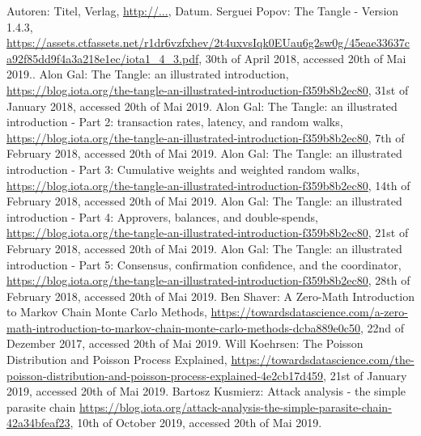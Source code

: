 \begin{thebibliography}{99}

 Autoren: Titel, Verlag, \url{http://...}, Datum.
 Serguei Popov: The Tangle - Version 1.4.3, \url{https://assets.ctfassets.net/r1dr6vzfxhev/2t4uxvsIqk0EUau6g2sw0g/45eae33637ca92f85dd9f4a3a218e1ec/iota1_4_3.pdf}, 30th of April 2018, accessed 20th of Mai 2019..
 Alon Gal: The Tangle: an illustrated introduction, \url{https://blog.iota.org/the-tangle-an-illustrated-introduction-f359b8b2ec80}, 31st of January 2018, accessed 20th of Mai 2019.
 Alon Gal: The Tangle: an illustrated introduction - Part 2: transaction rates, latency, and random walks, \url{https://blog.iota.org/the-tangle-an-illustrated-introduction-f359b8b2ec80}, 7th of February 2018, accessed 20th of Mai 2019.
 Alon Gal: The Tangle: an illustrated introduction - Part 3: Cumulative weights and weighted random walks, \url{https://blog.iota.org/the-tangle-an-illustrated-introduction-f359b8b2ec80}, 14th of February 2018, accessed 20th of Mai 2019.
 Alon Gal: The Tangle: an illustrated introduction - Part 4: Approvers, balances, and double-spends, \url{https://blog.iota.org/the-tangle-an-illustrated-introduction-f359b8b2ec80}, 21st of February 2018, accessed 20th of Mai 2019.
 Alon Gal: The Tangle: an illustrated introduction - Part 5: Consensus, confirmation confidence, and the coordinator, \url{https://blog.iota.org/the-tangle-an-illustrated-introduction-f359b8b2ec80}, 28th of February 2018, accessed 20th of Mai 2019.
 Ben Shaver: A Zero-Math Introduction to Markov Chain Monte Carlo Methods, \url{https://towardsdatascience.com/a-zero-math-introduction-to-markov-chain-monte-carlo-methods-dcba889e0c50}, 22nd of Dezember 2017, accessed 20th of Mai 2019.
 Will Koehrsen: The Poisson Distribution and Poisson Process Explained, \url{https://towardsdatascience.com/the-poisson-distribution-and-poisson-process-explained-4e2cb17d459}, 21st of January 2019, accessed 20th of Mai 2019.
 Bartosz Kusmierz: Attack analysis - the simple parasite chain \url{https://blog.iota.org/attack-analysis-the-simple-parasite-chain-42a34bfeaf23}, 10th of October 2019, accessed 20th of Mai 2019.


\end{thebibliography}

